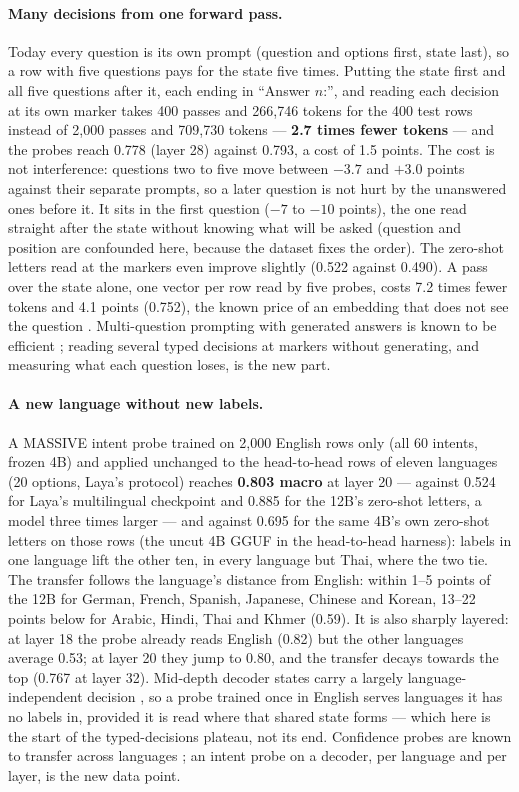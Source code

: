 \documentclass[11pt,a4paper]{article}
\begin{document}
\paragraph{Many decisions from one forward pass.} Today every question is its own prompt (question and options first, state last), so a row with five questions pays for the state five times. Putting the state first and all five questions after it, each ending in ``Answer $n$:'', and reading each decision at its own marker takes 400 passes and 266,746 tokens for the 400 test rows instead of 2,000 passes and 709,730 tokens --- \textbf{2.7 times fewer tokens} --- and the probes reach 0.778 (layer 28) against 0.793, a cost of 1.5 points. The cost is not interference: questions two to five move between $-3.7$ and $+3.0$ points against their separate prompts, so a later question is not hurt by the unanswered ones before it. It sits in the first question ($-7$ to $-10$ points), the one read straight after the state without knowing what will be asked (question and position are confounded here, because the dataset fixes the order). The zero-shot letters read at the markers even improve slightly (0.522 against 0.490). A pass over the state alone, one vector per row read by five probes, costs 7.2 times fewer tokens and 4.1 points (0.752), the known price of an embedding that does not see the question \cite{instructor}. Multi-question prompting with generated answers is known to be efficient \cite{mti}; reading several typed decisions at markers without generating, and measuring what each question loses, is the new part.

\paragraph{A new language without new labels.} A MASSIVE \cite{massive} intent probe trained on 2,000 English rows only (all 60 intents, frozen 4B) and applied unchanged to the head-to-head rows of eleven languages (20 options, Laya's protocol) reaches \textbf{0.803 macro} at layer 20 --- against 0.524 for Laya's multilingual checkpoint and 0.885 for the 12B's zero-shot letters, a model three times larger --- and against 0.695 for the same 4B's own zero-shot letters on those rows (the uncut 4B GGUF in the head-to-head harness): labels in one language lift the other ten, in every language but Thai, where the two tie. The transfer follows the language's distance from English: within 1--5 points of the 12B for German, French, Spanish, Japanese, Chinese and Korean, 13--22 points below for Arabic, Hindi, Thai and Khmer (0.59). It is also sharply layered: at layer 18 the probe already reads English (0.82) but the other languages average 0.53; at layer 20 they jump to 0.80, and the transfer decays towards the top (0.767 at layer 32). Mid-depth decoder states carry a largely language-independent decision \cite{wendler}, so a probe trained once in English serves languages it has no labels in, provided it is read where that shared state forms --- which here is the start of the typed-decisions plateau, not its end. Confidence probes are known to transfer across languages \cite{shareddoubt}; an intent probe on a decoder, per language and per layer, is the new data point.
\end{document}

